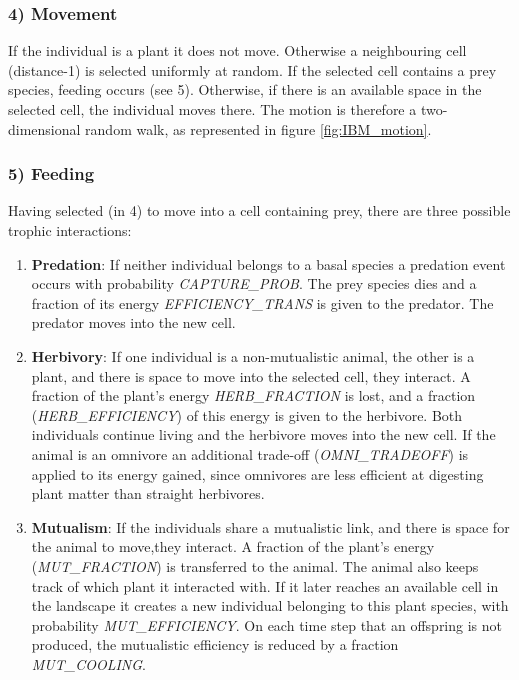 \subsubsection*{4) Movement}
If the individual is a plant it does not move. Otherwise a neighbouring cell (distance-1) is selected uniformly at random. If the selected cell contains a prey species, feeding occurs (see 5). Otherwise, if there is an available space in the selected cell, the individual moves there. The motion is therefore a two-dimensional random walk, as represented in figure \ref{fig:IBM_motion}.
\subsubsection*{5) Feeding}
Having selected (in 4) to move into a cell containing prey, there are three possible trophic interactions:

\begin{enumerate}
	\item \textbf{Predation}: If neither individual belongs to a basal species a predation event occurs with probability \emph{CAPTURE\_PROB}. The prey species dies and a fraction of its energy \emph{EFFICIENCY\_TRANS} is given to the predator. The predator moves into the new cell.
	\item \textbf{Herbivory}: If one individual is a non-mutualistic animal, the other is a plant, and there is space to move into the selected cell, they interact. A fraction of the plant's energy \emph{HERB\_FRACTION} is lost, and a fraction (\emph{HERB\_EFFICIENCY}) of this energy is given to the herbivore. Both individuals continue living and the herbivore moves into the new cell. If the animal is an omnivore an additional trade-off (\emph{OMNI\_TRADEOFF}) is applied to its energy gained, since omnivores are less efficient at digesting plant matter than straight herbivores.   
	\item \textbf{Mutualism}: If the individuals share a mutualistic link, and there is space for the animal to move,they interact. A fraction of the plant's energy (\emph{MUT\_FRACTION}) is transferred to the animal. The animal also keeps track of which plant it interacted with. If it later reaches an available cell in the landscape it creates a new individual belonging to this plant species, with probability \emph{MUT\_EFFICIENCY}. On each time step that an offspring is not produced, the mutualistic efficiency is reduced by a fraction \emph{MUT\_COOLING}.  
\end{enumerate}  

